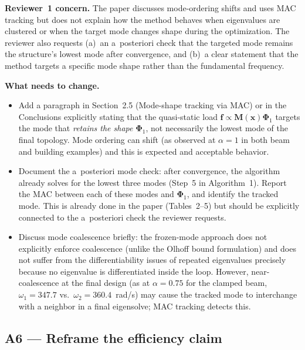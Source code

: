 \documentclass[12pt,a4paper]{article}
\begin{document}
\textbf{Reviewer~1 concern.}  The paper discusses mode-ordering shifts and
uses MAC tracking but does not explain how the method behaves when eigenvalues
are clustered or when the target mode changes shape during the optimization.
The reviewer also requests (a)~an a~posteriori check that the targeted mode
remains the structure's lowest mode after convergence, and (b)~a clear
statement that the method targets a specific mode shape rather than the
fundamental frequency.

\textbf{What needs to change.}
\begin{itemize}[leftmargin=1.6em]
  \item Add a paragraph in Section~2.5 (Mode-shape tracking via MAC) or in
        the Conclusions explicitly stating that the quasi-static load
        $\mathbf{f} \propto \mathbf{M}(\mathbf{x})\boldsymbol{\Phi}_1$
        targets the mode that \emph{retains the shape} $\boldsymbol{\Phi}_1$,
        not necessarily the lowest mode of the final topology.  Mode ordering
        can shift (as observed at $\alpha=1$ in both beam and building
        examples) and this is expected and acceptable behavior.
  \item Document the a~posteriori mode check: after convergence, the
        algorithm already solves for the lowest three modes (Step~5 in
        Algorithm~1). Report the MAC between each of these modes and
        $\boldsymbol{\Phi}_1$, and identify the tracked mode. This is already
        done in the paper (Tables~2--5) but should be explicitly connected to
        the a~posteriori check the reviewer requests.
  \item Discuss mode coalescence briefly: the frozen-mode approach does not
        explicitly enforce coalescence (unlike the Olhoff bound formulation)
        and does not suffer from the differentiability issues of repeated
        eigenvalues precisely because no eigenvalue is differentiated inside
        the loop.  However, near-coalescence at the final design (as at
        $\alpha=0.75$ for the clamped beam, $\omega_1=347.7$ vs.\
        $\omega_2=360.4$~rad/s) may cause the tracked mode to interchange
        with a neighbor in a final eigensolve; MAC tracking detects this.
\end{itemize}

\subsection{A6 — Reframe the efficiency claim}
\end{document}
